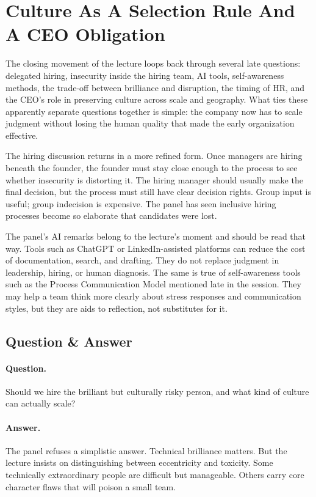 \section{Culture As A Selection Rule And A CEO Obligation}

The closing movement of the lecture loops back through several late questions: delegated hiring, insecurity inside the hiring team, AI tools, self-awareness methods, the trade-off between brilliance and disruption, the timing of HR, and the CEO's role in preserving culture across scale and geography. What ties these apparently separate questions together is simple: the company now has to scale judgment without losing the human quality that made the early organization effective.

The hiring discussion returns in a more refined form. Once managers are hiring beneath the founder, the founder must stay close enough to the process to see whether insecurity is distorting it. The hiring manager should usually make the final decision, but the process must still have clear decision rights. Group input is useful; group indecision is expensive. The panel has seen inclusive hiring processes become so elaborate that candidates were lost.

The panel's AI remarks belong to the lecture's moment and should be read that way. Tools such as ChatGPT or LinkedIn-assisted platforms can reduce the cost of documentation, search, and drafting. They do not replace judgment in leadership, hiring, or human diagnosis. The same is true of self-awareness tools such as the Process Communication Model mentioned late in the session. They may help a team think more clearly about stress responses and communication styles, but they are aids to reflection, not substitutes for it.

\subsection{Question \& Answer}

\paragraph{Question.} Should we hire the brilliant but culturally risky person, and what kind of culture can actually scale?

\paragraph{Answer.} The panel refuses a simplistic answer. Technical brilliance matters. But the lecture insists on distinguishing between eccentricity and toxicity. Some technically extraordinary people are difficult but manageable. Others carry core character flaws that will poison a small team.

